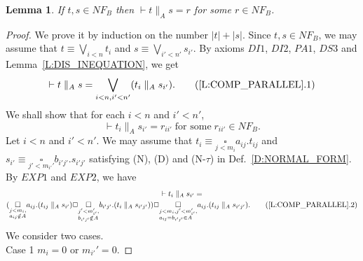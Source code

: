 \documentclass{elsarticle}
\theoremstyle{plain}
\newtheorem{lemma}[theorem]{Lemma}
\theoremstyle{definition}
\begin{document}
\begin{lemma}\label{L:COMP_PARALLEL}
  If $t,s \in NF_B$ then $\vdash  t\parallel_A s  = r$ for some $r \in NF_B$.
\end{lemma}
\begin{proof}
We prove it by induction on the number $|t|+|s|$.
Since $t,s \in NF_B$, we may assume that $t\equiv \underset{i< n}{\bigvee}t_{i}$ and $s\equiv \underset{i'< n'}{\bigvee}s_{i'}$.
 By axioms $DI1$, $DI2$, $PA1$, $DS3$ and Lemma~\ref{L:DIS_INEQUATION}, we get
    \[\vdash  t \parallel_A s
    = \underset{i< n,i'< n'}{\bigvee}(t_{i}\parallel_A s_{i'}). \tag{\ref{L:COMP_PARALLEL}.1}\]
    We shall show that for each $i< n$ and $i'< n'$,
    \[\vdash t_{i}\parallel_A s_{i'} =r_{ii'}\;\text{for some}\;r_{ii'} \in NF_B.\]
     Let $i< n$ and $i'< n'$.
     We may assume that $t_{i}\equiv \underset{j< m_{i}}{\square}a_{ij}.t_{ij}$ and $s_{i'}\equiv \underset{j'< m_{i'}'}{\square}b_{i'j'}.s_{i'j'}$ satisfying (N), (D) and (N-$\tau$) in Def.~\ref{D:NORMAL_FORM}.
     By $EXP1$ and $EXP2$, we have
            \begin{multline*}
                \vdash t_{i}\parallel_A s_{i'} =\\
                (\underset {\begin{subarray}
                   \;j< m_i,\\
                   a_{ij} \notin A
                \end{subarray}}
                \square a_{ij}.(t_{ij} \parallel_A s_{i'}) \Box
                \underset {\begin{subarray}
                   \;j'< m_{i'}',\\
                   b_{i'j'} \notin A
                \end{subarray}}
                \square
                b_{i'j'}.(t_{i} \parallel_A s_{i'j'})) \Box
             \underset {\begin{subarray}
                   \;j< m_i,j'<m_{i'}',\\
                  a_{ij}= b_{i'j'}\in A
                \end{subarray}}
                \square
                a_{ij}.(t_{ij} \parallel_A s_{i'j'}). \tag{\ref{L:COMP_PARALLEL}.2}
            \end{multline*}
    We consider two cases.\\

\noindent    Case 1 $m_i=0$ or $m_{i'}'=0$.


\end{proof}
\end{document}
